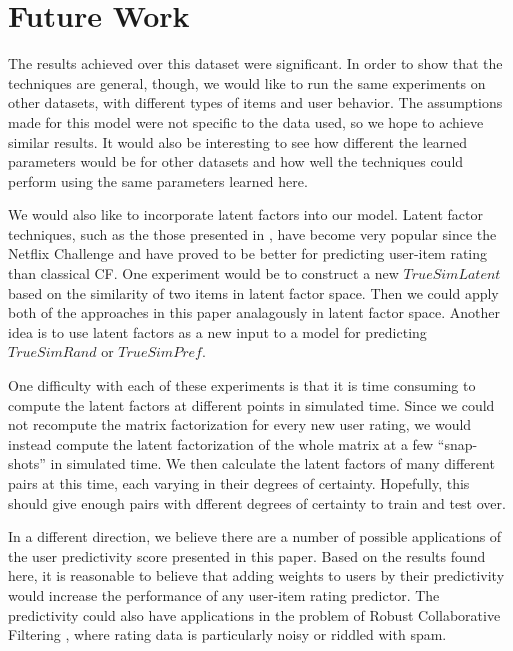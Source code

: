 \documentclass[11pt]{article}
\begin{document}
{\section*{Future Work}
The results achieved over this dataset were significant. In order to show that
the techniques are general, though, we would like to run the same experiments on
other datasets, with different types of items and user behavior. The 
assumptions made for this model were not specific to the data used, so we 
hope to achieve similar results. It would also be interesting to see how 
different the learned parameters would be for other datasets and how well 
the techniques could perform using the same parameters learned here.

We would also like to incorporate latent factors into our model.
Latent factor techniques, such as the those presented in \cite{Koren2009}, have
become very popular since the Netflix Challenge and have proved to be better for
predicting user-item rating than classical CF. One experiment would be to
construct a new $TrueSimLatent$ based on the similarity of two items in 
latent factor space. Then we could apply both of the approaches in this
paper analagously in latent factor space. Another idea is to use latent factors 
as a new input to a model for predicting $TrueSimRand$ or $TrueSimPref$. 

One difficulty with each of these experiments is that it is time consuming to 
compute the latent factors at different points in simulated time. Since we could
not recompute the matrix factorization for every new user rating, we would 
instead compute the latent factorization of the whole matrix at a few 
``snap-shots'' in simulated time. We then calculate the latent factors of many
different pairs at this time, each varying in their degrees of certainty. 
Hopefully, this should give enough pairs with dfferent degrees of certainty 
to train and test over.

In a different direction, we believe there are a number of possible applications
of the user predictivity score presented in this paper. Based on the results
found here, it is reasonable to believe that adding weights to users by their
predictivity would increase the performance of any user-item rating predictor.
The predictivity could also have applications in the problem of Robust
Collaborative Filtering \cite{Mehta2007}, where rating data is particularly noisy
or riddled with spam.

\begin{thebibliography}{9}


\end{thebibliography}}
\end{document}
